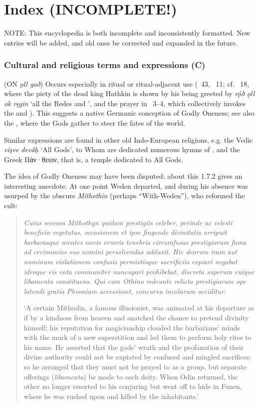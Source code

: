 \part{Index (INCOMPLETE!)}

NOTE: This encyclopedia is both incomplete and inconsistently formatted. New entries will be added, and old ones be corrected and expanded in the future.

\section{Cultural and religious terms and expressions (C)}
\begin{itemize}

 (ON \emph{ǫll goð})
  Occurs especially in ritual or ritual-adjacent use (\Grimnismal\ 43, \Lokasenna\ 11; cf. \Hakonarmal\ 18, where the piety of the dead king Hathkin is shown by his being greeted by \emph{rǫ́ð ǫll ok ręgin} ‘all the Redes and ’, and the prayer in \Sigrdrifumal\ 3–4, which collectively invokes the  and ).  This suggests a native Germanic conception of Godly Oneness; see also the , where the Gods gather to steer the fates of the world.

  Similar expressions are found in other old Indo-European religions, e.g. the Vedic \emph{víşve devā́ḥ} ‘All Gods’, to Whom are dedicated numerous hymns of \Rigveda, and the Greek \textgreek{Πάν·θειον}, that is, a temple dedicated to All Gods.

  The idea of Godly Oneness may have been disputed; about this \textcite{Saxo} 1.7.2 gives an interesting anecdote.  At one point Weden departed, and during his absence was usurped by the obscure \emph{Mithothin} (perhaps “With-Weden”), who reformed the cult:
  \begin{quote}
    {\small \emph{Cuius secessu Mithothyn quidam prestigiis celeber, perinde ac celesti beneficio vegetatus, occasionem et ipse fingende divinitatis arripuit barbarasque mentes novis erroris tenebris circumfusas prestigiarum fama ad cerimonias suo nomini persolvendas adduxit. Hic deorum iram aut numinum violationem confusis permixtisque sacrificiis expiari negabat ideoque eis vota communiter nuncupari prohibebat, discreta superum cuique libamenta constituens. Qui cum Othino redeunte relicta prestigiarum ope latendi gratia Pheoniam accessisset, concursu incolarum occiditur.}

    ‘A certain Mithodin, a famous illusionist, was animated at his departure as if by a kindness from heaven and snatched the chance to pretend divinity himself; his reputation for magicianship clouded the barbarians’ minds with the murk of a new superstition and led them to perform holy rites to his name. He asserted that the gods’ wrath and the profanation of their divine authority could not be expiated by confused and mingled sacrifices; so he arranged that they must not be prayed to as a group, but separate offerings (\emph{libamenta}) be made to each deity. When Odin returned, the other no longer resorted to his conjuring but went off to hide in Funen, where he was rushed upon and killed by the inhabitants.’}
  \end{quote}


\end{itemize}
